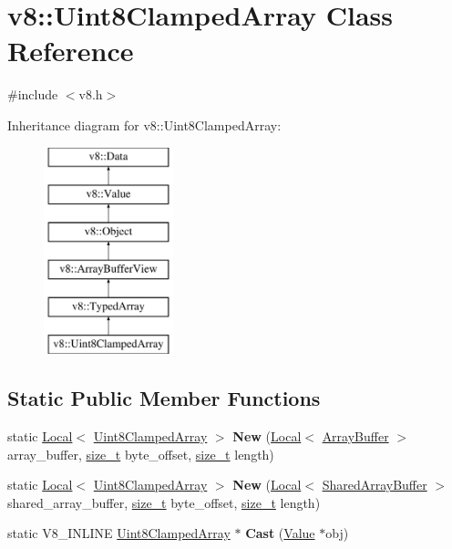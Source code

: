 \hypertarget{classv8_1_1Uint8ClampedArray}{}\section{v8\+:\+:Uint8\+Clamped\+Array Class Reference}
\label{classv8_1_1Uint8ClampedArray}


{\ttfamily \#include $<$v8.\+h$>$}

Inheritance diagram for v8\+:\+:Uint8\+Clamped\+Array\+:\begin{figure}[H]
\begin{center}
\leavevmode
\includegraphics[height=6.000000cm]{classv8_1_1Uint8ClampedArray}
\end{center}
\end{figure}
\subsection*{Static Public Member Functions}
\begin{DoxyCompactItemize}
\item 
\mbox{\label{classv8_1_1Uint8ClampedArray_abadcd9c3c77b071e21f3140e0ed4411f}} 
static \mbox{\hyperlink{classv8_1_1Local}{Local}}$<$ \mbox{\hyperlink{classv8_1_1Uint8ClampedArray}{Uint8\+Clamped\+Array}} $>$ {\bfseries New} (\mbox{\hyperlink{classv8_1_1Local}{Local}}$<$ \mbox{\hyperlink{classv8_1_1ArrayBuffer}{Array\+Buffer}} $>$ array\+\_\+buffer, \mbox{\hyperlink{classsize__t}{size\+\_\+t}} byte\+\_\+offset, \mbox{\hyperlink{classsize__t}{size\+\_\+t}} length)
\item 
\mbox{\label{classv8_1_1Uint8ClampedArray_a4f42e014ea0d35b33b6160bab223b4e3}} 
static \mbox{\hyperlink{classv8_1_1Local}{Local}}$<$ \mbox{\hyperlink{classv8_1_1Uint8ClampedArray}{Uint8\+Clamped\+Array}} $>$ {\bfseries New} (\mbox{\hyperlink{classv8_1_1Local}{Local}}$<$ \mbox{\hyperlink{classv8_1_1SharedArrayBuffer}{Shared\+Array\+Buffer}} $>$ shared\+\_\+array\+\_\+buffer, \mbox{\hyperlink{classsize__t}{size\+\_\+t}} byte\+\_\+offset, \mbox{\hyperlink{classsize__t}{size\+\_\+t}} length)
\item 
\mbox{\label{classv8_1_1Uint8ClampedArray_aa1358e0ac24e305af5c90ba71b73fa7c}} 
static V8\+\_\+\+I\+N\+L\+I\+NE \mbox{\hyperlink{classv8_1_1Uint8ClampedArray}{Uint8\+Clamped\+Array}} $\ast$ {\bfseries Cast} (\mbox{\hyperlink{classv8_1_1Value}{Value}} $\ast$obj)
\end{DoxyCompactItemize}
